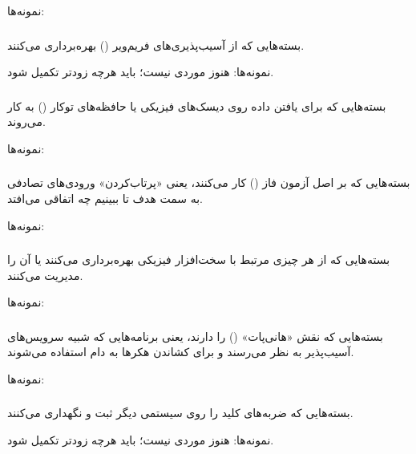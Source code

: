 \documentclass[a4paper, oneside, 11pt]{book}
\begin{document}
نمونه‌ها: 

\subsubsection{}
بسته‌هایی که از آسیب‌پذیری‌های فریم‌ویر () بهره‌برداری می‌کنند.

نمونه‌ها: هنوز موردی نیست؛ باید هرچه زودتر تکمیل شود.

\subsubsection{}
بسته‌هایی که برای یافتن داده روی دیسک‌های فیزیکی یا حافظه‌های توکار
() به کار می‌روند.

نمونه‌ها: 

\subsubsection{}
بسته‌هایی که بر اصل آزمون فاز () کار می‌کنند، یعنی «پرتاب‌کردن»
ورودی‌های تصادفی به سمت هدف تا ببینیم چه اتفاقی می‌افتد.

نمونه‌ها: 

\subsubsection{}
بسته‌هایی که از هر چیزی مرتبط با سخت‌افزار فیزیکی بهره‌برداری می‌کنند یا آن را
مدیریت می‌کنند.

نمونه‌ها: 

\subsubsection{}
بسته‌هایی که نقش «هانی‌پات» () را دارند، یعنی برنامه‌هایی که شبیه
سرویس‌های آسیب‌پذیر به نظر می‌رسند و برای کشاندن هکرها به دام استفاده
می‌شوند.

نمونه‌ها: 

\subsubsection{}
بسته‌هایی که ضربه‌های کلید را روی سیستمی دیگر ثبت و نگهداری می‌کنند.

نمونه‌ها: هنوز موردی نیست؛ باید هرچه زودتر تکمیل شود.
\end{document}
